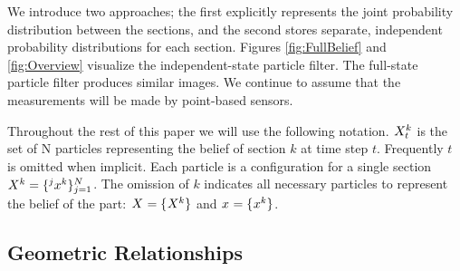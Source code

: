 \documentclass[letterpaper, 10 pt, conference]{ieeeconf}
\begin{document}

We introduce two approaches; the first explicitly represents
the joint probability distribution between the sections, and the second stores separate,
independent probability distributions for each section.
Figures \ref{fig:FullBelief} and \ref{fig:Overview} visualize the independent-state particle filter. The full-state particle filter produces similar images.
We continue to assume that the measurements will be made by point-based sensors.

Throughout the rest of this paper we will use the following notation.
$\particles[t][][k]$ is the set of N particles representing the belief of section $k$ at time step $t$.
Frequently $t$ is omitted when implicit.
Each particle is a configuration for a single section $\particles[][][k] = \{\particle[][j][k]\}_{j=1}^{N}$.
The omission of $k$ indicates all necessary particles to represent the belief of the part: $\particles = \{\particles[][][k]\}$ and $\particle = \{\particle[][][k]\}$.



\subsection{Geometric Relationships}
\end{document}
